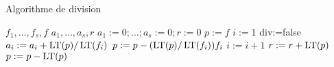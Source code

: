 \begin{algorithm}

\caption{Algorithme de division}

\begin{algorithmic}
\REQUIRE $f_1,\ldots,f_s,f$
\ENSURE $a_1,\ldots,a_s,r$
\STATE $a_1 :=0 ;\ldots ; a_s:=0 ; r:=0$
\STATE $p:=f$
\STATE $i:=1$
\STATE div:=false 
\STATE $a_i:= a_i+\operatorname{\mathrm{LT}} (p)/\operatorname{\mathrm{LT}} (f_i)$
\STATE $p:=p-(\operatorname{\mathrm{LT}}(p)/\operatorname{\mathrm{LT}} (f_i)) f_i$
\ELSE
\STATE $i:=i+1$
\ENDIF
\ENDWHILE
{}
\STATE $r:=r+\operatorname{\mathrm{LT}} (p)$
\STATE $p:=p-\operatorname{\mathrm{LT}} (p) $
\ENDIF
\ENDWHILE
\end{algorithmic}

\end{algorithm}
